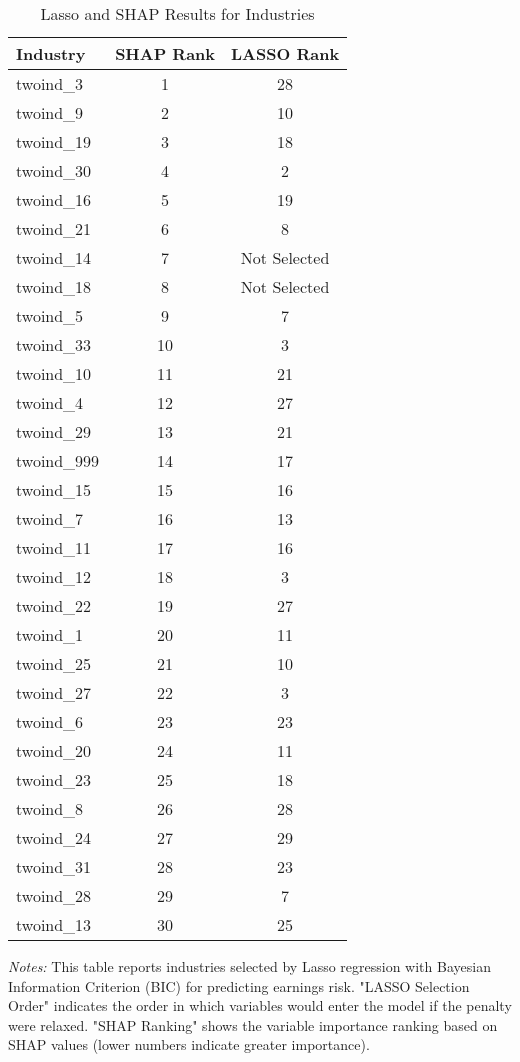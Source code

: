 \documentclass[12pt]{article}
\begin{document}
\begin{table}[H]
\centering

\caption{Lasso and SHAP Results for Industries}

\begin{tabular}{lcc}

\toprule
Industry & SHAP Rank & LASSO Rank\\
\midrule
twoind\_3 & 1 & 28 \\
twoind\_9 & 2 & 10 \\
twoind\_19 & 3 & 18 \\
twoind\_30 & 4 & 2 \\
twoind\_16 & 5 & 19 \\
twoind\_21 & 6 & 8 \\
twoind\_14 & 7 & Not Selected \\
twoind\_18 & 8 & Not Selected \\
twoind\_5 & 9 & 7 \\
twoind\_33 & 10 & 3 \\
twoind\_10 & 11 & 21 \\
twoind\_4 & 12 & 27 \\
twoind\_29 & 13 & 21 \\
twoind\_999 & 14 & 17 \\
twoind\_15 & 15 & 16 \\
twoind\_7 & 16 & 13 \\
twoind\_11 & 17 & 16 \\
twoind\_12 & 18 & 3 \\
twoind\_22 & 19 & 27 \\
twoind\_1 & 20 & 11 \\
twoind\_25 & 21 & 10 \\
twoind\_27 & 22 & 3 \\
twoind\_6 & 23 & 23 \\
twoind\_20 & 24 & 11 \\
twoind\_23 & 25 & 18 \\
twoind\_8 & 26 & 28 \\
twoind\_24 & 27 & 29 \\
twoind\_31 & 28 & 23 \\
twoind\_28 & 29 & 7 \\
twoind\_13 & 30 & 25 \\
\bottomrule
\end{tabular}%
\newline

\footnotesize
\textit{Notes:} This table reports industries selected by Lasso regression with Bayesian Information Criterion (BIC) for predicting earnings risk. "LASSO Selection Order" indicates the order in which variables would enter the model if the penalty were relaxed. "SHAP Ranking" shows the variable importance ranking based on SHAP values (lower numbers indicate greater importance).

\end{table}










\end{document}
